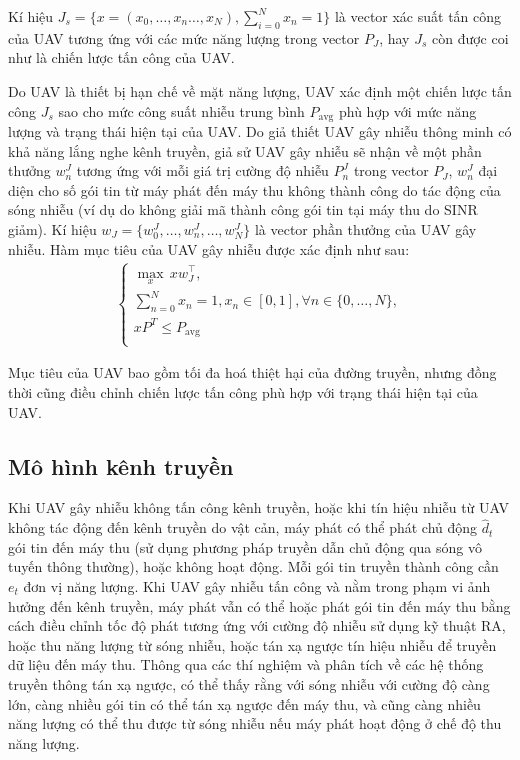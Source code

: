 \documentclass{uetgraduation}
\begin{document}
Kí hiệu $J_s = \{x = (x_0, \dots, x_n\dots, x_N), \sum_{i=0}^{N}x_n = 1\}$ là vector xác suất tấn công của UAV tương ứng với các mức năng lượng trong vector $P_J$, hay $J_s$ còn được coi như
là chiến lược tấn công của UAV.

Do UAV là thiết bị hạn chế về mặt năng lượng, UAV xác định một chiến lược tấn công $J_s$ sao cho mức công suất nhiễu trung bình $P_\text{avg}$ phù hợp với mức năng lượng và trạng thái hiện tại của UAV.
Do giả thiết UAV gây nhiễu thông minh có khả năng lắng nghe kênh truyền, giả sử UAV gây nhiễu sẽ nhận về một phần thưởng $w_n^J$ tương ứng với mỗi giá trị cường độ nhiễu $P_n^J$ trong vector $P_J$, $w_n^J$ đại diện
cho số gói tin từ máy phát đến máy thu không thành công do tác động của sóng nhiễu (ví dụ do không giải mã thành công gói tin tại máy thu do SINR giảm). Kí hiệu $w_J = \{w_0^J, \dots, w_n^J, \dots, w_N^J\}$
là vector phần thưởng của UAV gây nhiễu. Hàm mục tiêu của UAV gây nhiễu được xác định như sau:
\begin{equation}
    \begin{split}
        \begin{cases}
            \underset{x}{\max} \, x w_J^\top, \\
            \sum_{n=0}^{N} x_n = 1, x_n \in [0, 1], \forall n \in \{0, \dots, N\}, \\
            x P^T \leq P_\text{avg} \\
        \end{cases}
    \end{split}
\end{equation}

Mục tiêu của UAV bao gồm tối đa hoá thiệt hại của đường truyền, nhưng đồng thời cũng điều chỉnh chiến lược tấn công phù hợp với trạng thái hiện tại của UAV.

\subsection{Mô hình kênh truyền}
Khi UAV gây nhiễu không tấn công kênh truyền, hoặc khi tín hiệu nhiễu từ UAV không tác động đến kênh truyền do vật cản, máy phát có thể phát chủ động $\hat{d}_t$
gói tin đến máy thu (sử dụng phương pháp truyền dẫn chủ động qua sóng vô tuyến thông thường), hoặc không hoạt động. Mỗi gói tin truyền thành công cần $e_t$ đơn vị năng lượng.
Khi UAV gây nhiễu tấn công và nằm trong phạm vi ảnh hưởng đến kênh truyền, máy phát vẫn có thể hoặc phát gói tin đến máy thu bằng cách điều chỉnh tốc độ phát tương
ứng với cường độ nhiễu sử dụng kỹ thuật RA, hoặc thu năng lượng từ sóng nhiễu, hoặc tán xạ ngược tín hiệu nhiễu để truyền dữ liệu đến máy thu. Thông qua các thí nghiệm
và phân tích về các hệ thống truyền thông tán xạ ngược, có thể thấy rằng với sóng nhiễu với cường độ càng lớn, càng nhiều gói tin có thể tán xạ ngược đến máy thu, và cũng
càng nhiều năng lượng có thể thu được từ sóng nhiễu nếu máy phát hoạt động ở chế độ thu năng lượng. 
\end{document}
